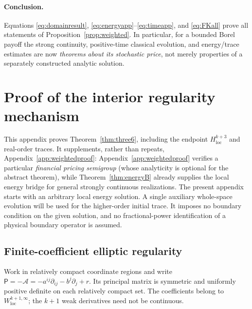 \documentclass[11pt,a4paper]{article}
\theoremstyle{definition}\newtheorem{definition}{Definition}[section]\newtheorem{example}[theorem]{Example}
\theoremstyle{remark}\newtheorem{remark}[theorem]{Remark}\newtheorem{remarkSix}{Remark}[section]
\newcommand{\loc}{\mathrm{loc}}
\newcommand{\cA}{\mathcal A}
\begin{document}
\paragraph{Conclusion.}
Equations \eqref{eq:domainresult}, \eqref{eq:energyapp}--\eqref{eq:timeapp}, and \eqref{eq:FKall} prove all statements of Proposition~\ref{prop:weighted}. In particular, for a bounded Borel payoff the strong continuity, positive-time classical evolution, and energy/trace estimates are now \emph{theorems about its stochastic price}, not merely properties of a separately constructed analytic solution.


\clearpage
\section{Proof of the interior regularity mechanism}
\label{app:interiorproof}
This appendix proves Theorem~\ref{thm:three6}, including the endpoint $H^{k+3}_{\loc}$ and real-order traces. It supplements, rather than repeats, Appendix~\ref{app:weightedproof}: Appendix~\ref{app:weightedproof} verifies a particular \emph{financial pricing semigroup} (whose analyticity is optional for the abstract theorem), while Theorem~\ref{thm:energyB} already supplies the local energy bridge for general strongly continuous realizations. The present appendix starts with an arbitrary local energy solution. A single auxiliary whole-space evolution will be used for the higher-order initial trace. It imposes no boundary condition on the given solution, and no fractional-power identification of a physical boundary operator is assumed.

\subsection{Finite-coefficient elliptic regularity}
\label{subsec:ellipticB}
Work in relatively compact coordinate regions and write $\mathsf P=-\cA=-a^{ij}\partial_{ij}-b^j\partial_j+r$. Its principal matrix is symmetric and uniformly positive definite on each relatively compact set. The coefficients belong to $W^{k+1,\infty}_{\loc}$; the $k+1$ weak derivatives need not be continuous.
\end{document}
